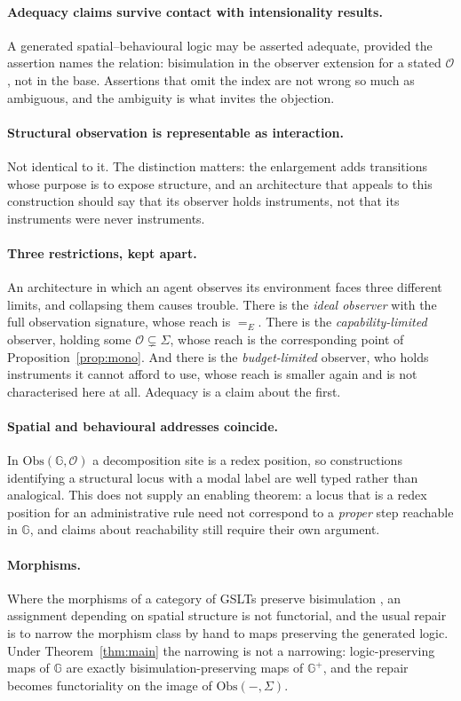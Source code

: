 \documentclass[11pt]{article}
\theoremstyle{plain}
\theoremstyle{definition}
\newcommand{\Gg}{\mathbb{G}}
\newcommand{\Obs}{\mathrm{Obs}}
\newcommand{\Ob}{\mathcal{O}}
\begin{document}
\paragraph{Adequacy claims survive contact with intensionality results.} A generated spatial--behavioural
logic may be asserted adequate, provided the assertion names the relation: bisimulation in the observer
extension for a stated $\Ob$, not in the base. Assertions that omit the index are not wrong so much as
ambiguous, and the ambiguity is what invites the objection.

\paragraph{Structural observation is representable as interaction.} Not identical to it. The
distinction matters: the enlargement adds transitions whose purpose is to expose structure, and an
architecture that appeals to this construction should say that its observer holds instruments, not that
its instruments were never instruments.

\paragraph{Three restrictions, kept apart.} An architecture in which an agent observes its environment
faces three different limits, and collapsing them causes trouble. There is the \emph{ideal observer}
with the full observation signature, whose reach is $=_E$. There is the \emph{capability-limited}
observer, holding some $\Ob \subsetneq \Sigma$, whose reach is the corresponding point of
Proposition~\ref{prop:mono}. And there is the \emph{budget-limited} observer, who holds instruments it
cannot afford to use, whose reach is smaller again and is not characterised here at all. Adequacy is a
claim about the first.

\paragraph{Spatial and behavioural addresses coincide.} In $\Obs(\Gg,\Ob)$ a decomposition site is a
redex position, so constructions identifying a structural locus with a modal label are well typed rather
than analogical. This does not supply an enabling theorem: a locus that is a redex position for an
administrative rule need not correspond to a \emph{proper} step reachable in $\Gg$, and claims about
reachability still require their own argument.

\paragraph{Morphisms.} Where the morphisms of a category of GSLTs preserve bisimulation \cite{Omnibus},
an assignment depending on spatial structure is not functorial, and the usual repair is to narrow the
morphism class by hand to maps preserving the generated logic. Under Theorem~\ref{thm:main} the
narrowing is not a narrowing: logic-preserving maps of $\Gg$ are exactly bisimulation-preserving maps of
$\Gg^+$, and the repair becomes functoriality on the image of $\Obs(-,\Sigma)$.
\end{document}
